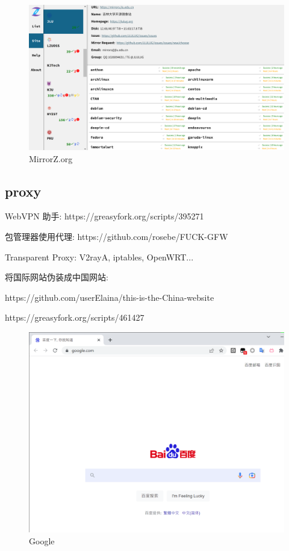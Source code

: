 \documentclass[a4paper]{article}
\begin{document}
\begin{figure}[hb]
    \centering
    \includegraphics[height=.4\textheight]{figures/mirrorz.png}
    \caption{MirrorZ.org}
\end{figure}

\subsection{\LARGE proxy}

WebVPN 助手: https://greasyfork.org/scripts/395271

包管理器使用代理: https://github.com/rosebe/FUCK-GFW

Transparent Proxy: V2rayA, iptables, OpenWRT...

将国际网站伪装成中国网站:

https://github.com/userElaina/this-is-the-China-website

https://greasyfork.org/scripts/461427

\begin{figure}[hb]
    \centering
    \includegraphics[height=.4\textheight]{figures/google.png}
    \caption{Google}
\end{figure}
\end{document}
